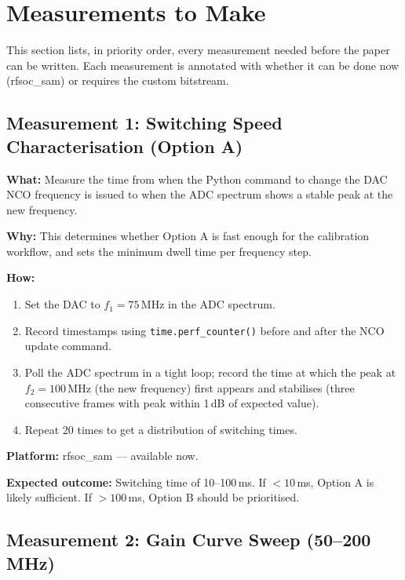 \documentclass[11pt,a4paper]{article}
\begin{document}
\section{Measurements to Make}
\label{sec:tests}

This section lists, in priority order, every measurement needed before the paper
can be written. Each measurement is annotated with whether it can be done now
(rfsoc\_sam) or requires the custom bitstream.

\subsection{Measurement 1: Switching Speed Characterisation (Option A)}
\label{sec:m1}

\textbf{What:} Measure the time from when the Python command to change the DAC NCO
frequency is issued to when the ADC spectrum shows a stable peak at the new
frequency.

\textbf{Why:} This determines whether Option A is fast enough for the calibration
workflow, and sets the minimum dwell time per frequency step.

\textbf{How:}
\begin{enumerate}[leftmargin=2em,itemsep=2pt]
  \item Set the DAC to $f_1 = 75$\,MHz in the ADC spectrum.
  \item Record timestamps using \texttt{time.perf\_counter()} before and after the
        NCO update command.
  \item Poll the ADC spectrum in a tight loop; record the time at which the peak
        at $f_2 = 100$\,MHz (the new frequency) first appears and stabilises
        (three consecutive frames with peak within 1\,dB of expected value).
  \item Repeat 20 times to get a distribution of switching times.
\end{enumerate}

\textbf{Platform:} rfsoc\_sam --- available now.

\textbf{Expected outcome:} Switching time of 10--100\,ms. If $< 10$\,ms, Option A
is likely sufficient. If $> 100$\,ms, Option B should be prioritised.

\subsection{Measurement 2: Gain Curve Sweep (50--200\,MHz)}
\label{sec:m2}
\end{document}
